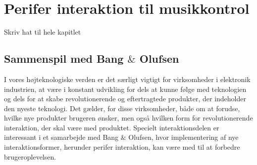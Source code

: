 \chapter{Perifer interaktion til musikkontrol}
\label{PeriferInteraktionTilMusikKontrol}
%
Skriv hat til hele kapitlet

\section{Sammenspil med Bang $\&$ Olufsen}
\label{SammenspilMedBO}
%
I vores højteknologiske verden er det særligt vigtigt for virksomheder i elektronik industrien, at være i konstant udvikling for dels at kunne følge med teknologien og dels for at skabe revolutionerende og eftertragtede produkter, der indeholder den nyeste teknologi. Det gælder, for disse virksomheder, både om at forudse, hvilke nye produkter brugeren ønsker, men også hvilken form for revolutionerende interaktion, der skal være med produktet. Specielt interaktionsdelen er interessant i et samarbejde med Bang $\&$ Olufsen, hvor implementering af nye interaktionsformer, herunder perifer interaktion, kan være med til at forbedre brugeroplevelsen.

